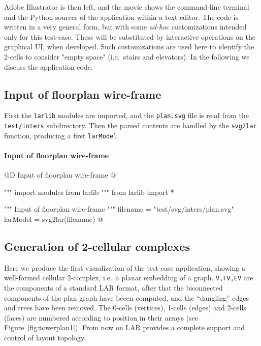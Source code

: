 \documentclass[11pt,oneside]{article}    %
\begin{document}
Adobe Illustrator is then left, and the movie shows the command-line terminal and the Python sources of the application within a text editor. The code is written in a very general form, but with some \emph{ad-hoc} customizations intended only for this test-case. These will be substituted by interactive operations on the graphical UI, when developed. Such customizations are used here to identify the 2-cells to consider "empty space" (i.e.~stairs and elevators). In the following we discuss the application code.

\subsection{Input of floorplan wire-frame}

First the \texttt{larlib} modules are imported, and the \texttt{plan.svg} file is read from the \texttt{test/inters} subdirectory.
Then the parsed contents are handled by the \texttt{svg2lar} function, producing a first \texttt{larModel}.

\paragraph{Input of floorplan wire-frame}
@D Input of floorplan wire-frame
@{""" import modules from larlib """
from larlib import *

""" Input of floorplan wire-frame """
filename = "test/svg/inters/plan.svg"
larModel = svg2lar(filename)
@}

\subsection{Generation of 2-cellular complexes}

Here we produce the first visualization of the test-case application, showing a well-formed cellular  2-complex, i.e.~a planar embedding of a graph. \texttt{V,FV,EV} are the components of a standard LAR format, after that the biconnected components of the plan graph have beeen computed, and the ``dangling'' edges and trees have been removed.
The 0-cells (vertices), 1-cells (edges) and 2-cells (faces) are numbered according to position in their arrays (see Figure~\ref{fig:towerplan1}).
From now on LAR provides a complete support and control of layout topology.
\end{document}
